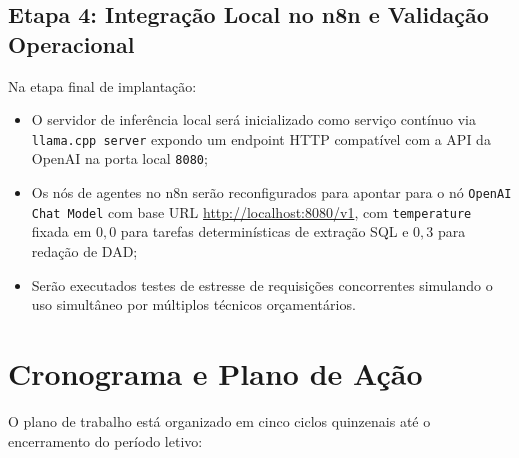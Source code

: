 \documentclass[11pt]{article}
\begin{document}
\subsection{Etapa 4: Integração Local no n8n e Validação Operacional}
Na etapa final de implantação:
\begin{itemize}
    \item O servidor de inferência local será inicializado como serviço contínuo via \texttt{llama.cpp server} expondo um endpoint HTTP compatível com a API da OpenAI na porta local \texttt{8080};
    \item Os nós de agentes no n8n serão reconfigurados para apontar para o nó \texttt{OpenAI Chat Model} com base URL \url{http://localhost:8080/v1}, com \texttt{temperature} fixada em $0{,}0$ para tarefas determinísticas de extração SQL e $0{,}3$ para redação de DAD;
    \item Serão executados testes de estresse de requisições concorrentes simulando o uso simultâneo por múltiplos técnicos orçamentários.
\end{itemize}

\section{Cronograma e Plano de Ação}

O plano de trabalho está organizado em cinco ciclos quinzenais até o encerramento do período letivo:
\end{document}
